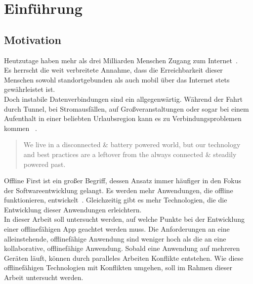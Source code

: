 \chapter{\label{chap:einleitung}Einführung}
\section{Motivation}

Heutzutage haben mehr als drei Milliarden Menschen Zugang zum Internet~\cite{dev-report}.\\
Es herrscht die weit verbreitete Annahme, dass die Erreichbarkeit dieser Menschen sowohl standortgebunden als auch mobil über das Internet stets gewährleistet ist.\\
Doch instabile Datenverbindungen sind ein allgegenwärtig. Während der Fahrt durch Tunnel, bei Stromausfällen, auf Großveranstaltungen oder sogar bei einem Aufenthalt in einer beliebten Urlaubsregion kann es zu Verbindungsproblemen kommen ~\cite{offline_ux, ndr}.\vspace{0.3cm}
\begin{quote}
	We live in a disconnected \& battery powered world, but our technology and best practices are a leftover from the always connected \& steadily powered past.
	\cite{offlinefirst}\vspace{0.3cm}
\end{quote}
% 
Offline First ist ein großer Begriff, dessen Ansatz immer häufiger in den Fokus der Softwareentwicklung gelangt. Es werden mehr Anwendungen, die offline funktionieren, entwickelt~\cite{heise}.
Gleichzeitig gibt es mehr Technologien, die die Entwicklung dieser Anwendungen erleichtern.\\
In dieser Arbeit soll untersucht werden, auf welche Punkte bei der Entwicklung einer offlinefähigen \gls{App} geachtet werden muss.
Die Anforderungen an eine alleinstehende, offlinefähige Anwendung sind weniger hoch als die an eine kollaborative, offlinefähige Anwendung.
Sobald eine Anwendung auf mehreren Geräten läuft, können durch paralleles Arbeiten Konflikte entstehen.
Wie diese offlinefähigen Technologien mit Konflikten umgehen, soll im Rahmen dieser Arbeit untersucht werden.
%
%
\clearpage
